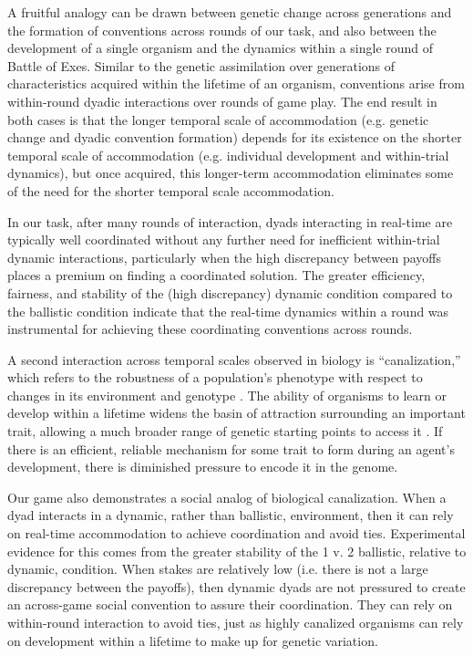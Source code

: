 \documentclass[10pt,letterpaper]{article}
\begin{document}
A fruitful analogy can be drawn between genetic change across generations and the formation of conventions across rounds of  our task, and also between the development of a single organism and the dynamics within a single round of Battle of Exes.  Similar to the genetic assimilation over generations of characteristics acquired within the lifetime of an organism, conventions arise from within-round dyadic interactions over rounds of game play.  The end result in both cases is that the longer temporal scale of accommodation (e.g. genetic change and dyadic convention formation) depends for its existence on the shorter temporal scale of accommodation (e.g. individual development and within-trial dynamics), but once acquired, this longer-term accommodation eliminates some of the need for the shorter temporal scale accommodation.  

In our task, after many rounds of interaction,  dyads interacting in real-time are typically well coordinated without any further need for inefficient within-trial dynamic interactions, particularly when the high discrepancy between payoffs places a premium on finding a coordinated solution. The greater efficiency, fairness, and stability of the (high discrepancy) dynamic condition compared to the ballistic condition indicate that the real-time dynamics within a round was instrumental for achieving these coordinating conventions across rounds.

A second interaction across temporal scales observed in biology is ``canalization,'' which refers to the robustness of a population's phenotype with respect to changes in its environment and genotype \cite{Waddington42_Canalization}. The ability of organisms to learn or develop within a lifetime widens the basin of attraction surrounding an important trait, allowing a much broader range of genetic starting points to access it \cite{ HintonNowlan87_LearningGuidesEvolution}. If there is an efficient, reliable mechanism for some trait to form during an agent's development, there is diminished pressure to encode it in the genome.

Our game also demonstrates a social analog of biological canalization.  When a dyad interacts in a dynamic, rather than ballistic, environment, then it can rely on real-time accommodation to achieve coordination and avoid ties.  Experimental evidence for this comes from the greater stability of the 1 v. 2 ballistic, relative to dynamic, condition.  When stakes are relatively low (i.e. there is not a large discrepancy between the payoffs), then dynamic dyads are not pressured to create an across-game social convention to assure their coordination.  They can rely on within-round interaction to avoid ties, just as highly canalized organisms can rely on development within a lifetime to make up for genetic variation.
\end{document}
